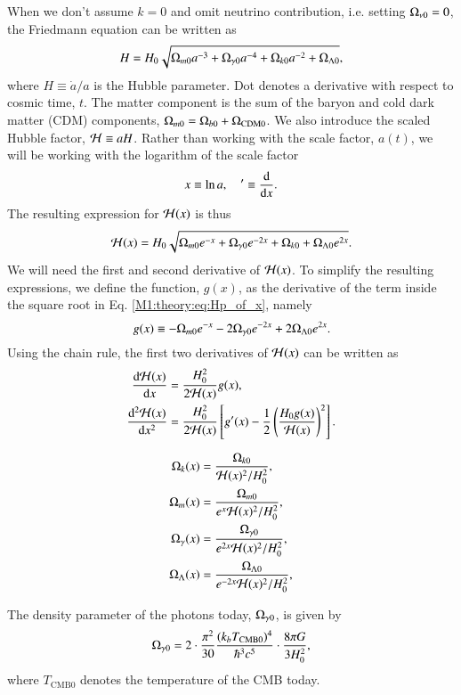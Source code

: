 When we don't assume $k=0$ and omit neutrino contribution, i.e. setting $\Omega_{\nu 0}=0$, the Friedmann equation can be written as 
\begin{equation}
    H = H_0 \sqrt{\Omega_{m0} a^{-3} + \Omega_{\gamma 0} a^{-4} + \Omega_{k0} a^{-2} + \Omega_{\Lambda 0}}, \label{M1:theory:eq:Friedmann_H_omegas}
\end{equation}
where $H\equiv\dot{a}/a$ is the Hubble parameter. Dot denotes a derivative with respect to cosmic time, $t$. The matter component is the sum of the baryon and cold dark matter (CDM) components, $\Omega_{m0}=\Omega_{b0}+\Omega_\mathrm{CDM0}$. We also introduce the scaled Hubble factor, $\mathcal{H}\equiv aH$. Rather than working with the scale factor, $a(t)$, we will be working with the logarithm of the scale factor 
\begin{equation} \label{M1:theory:eq:x_dx_definitions}
    x\equiv \ln a,\quad '\equiv \dv{x}. 
\end{equation}
%
%
The resulting expression for $\mathcal{H}(x)$ is thus  
\begin{equation} \label{M1:theory:eq:Hp_of_x}
    \mathcal{H}(x) = H_0 \sqrt{\Omega_{m0} e^{-x} + \Omega_{\gamma 0} e^{-2x} + \Omega_{k0} + \Omega_{\Lambda 0} e^{2x}}. 
\end{equation}
%
%
We will need the first and second derivative of $\mathcal{H}(x)$. To simplify the resulting expressions, we define the function, $g(x)$, as the derivative of the term inside the square root in Eq. \eqref{M1:theory:eq:Hp_of_x}, namely 
\begin{equation}
    g(x) \equiv -\Omega_{m0} e^{-x} -2\Omega_{\gamma 0} e^{-2x} + 2\Omega_{\Lambda 0} e^{2x}. \label{M1:theory:eq:g_of_x} 
\end{equation} 
%
Using the chain rule, the first two derivatives of $\mathcal{H}(x)$ can be written as 
\begin{align} 
    \dv{\mathcal{H}(x)}{x} &= \frac{H_0^2}{2\mathcal{H}(x)}g(x), \label{M1:theory:eq:dHp_dx} \\
    \dv[2]{\mathcal{H}(x)}{x} &= \frac{H_0^2}{2\mathcal{H}(x)}\left[ g'(x) - \frac{1}{2}\left( \frac{H_0 g(x)}{\mathcal{H}(x)} \right)^2 \right]. \label{M1:theory:eq:ddHp_ddx}
\end{align}


\begin{align}
    \Omega_{k}(x) &= \frac{\Omega_{k0}}{\mathcal{H}(x)^2 / H_0^2}, \\ 
    \Omega_{m}(x) &= \frac{\Omega_{m0}}{e^x \mathcal{H}(x)^2 / H_0^2}, \\ 
    \Omega_{\gamma}(x) &= \frac{\Omega_{\gamma 0}}{e^{2x} \mathcal{H}(x)^2 / H_0^2}, \\ 
    \Omega_{\Lambda}(x) &= \frac{\Omega_{\Lambda 0}}{e^{-2x} \mathcal{H}(x)^2 / H_0^2}, \\    
\end{align}

The density parameter of the photons today, $\Omega_{\gamma 0}$, is given by 
\begin{equation}
    \Omega_{\gamma 0} = 2 \cdot \frac{\pi^2}{30} \frac{(k_b T_\mathrm{CMB0})^4}{\hbar^3 c^5} \cdot \frac{8\pi G}{3H_0^2}, \label{M1:theory:eq:omega_gamma0_T}
\end{equation}
where $T_\mathrm{CMB0}$ denotes the temperature of the CMB today. 


